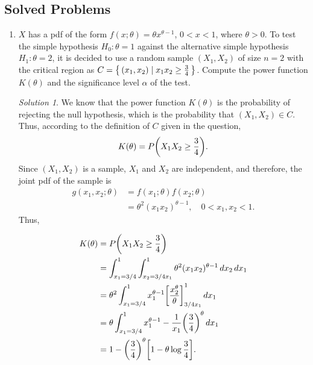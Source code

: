 \documentclass[svgnames, a5paper]{article}
\theoremstyle{definition}
\theoremstyle{remark}
\newtheorem*{Solution*}{Solution}
\begin{document}
\subsection{Solved Problems}\label{subsec:SolvedProblems1}
\begin{enumerate}
\item $X$ has a pdf of the form $f(x; \theta) = \theta x^{\theta - 1}$, $0 < x < 1$, where $\theta > 0$. To test the simple hypothesis $H_0 \colon \theta = 1$ against the alternative simple hypothesis $H_1 \colon \theta = 2$, it is decided to use a random sample $(X_1, X_2)$ of size $n = 2$ with the critical region as $C = \qty{\, (x_1, x_2) \mid x_1 x_2 \ge \frac 3 4 \,}$. Compute the power function $K(\theta)$ and the significance level $\alpha$ of the test.
\begin{Solution*}
We know that the power function $K(\theta)$ is the probability of rejecting the null hypothesis, which is the probability that $(X_1, X_2) \in C$. Thus, according to the definition of $C$ given in the question,
\begin{align*}
K(\theta) = P\pqty{ X_1 X_2 \ge \frac 3 4 }.
\end{align*}
Since $(X_1, X_2)$ is a sample, $X_1$ and $X_2$ are independent, and therefore, the joint pdf of the sample is
\begin{align*}
g(x_1, x_2; \theta) &= f(x_1; \theta) f(x_2; \theta) \\
	&= \theta^2 (x_1 x_2)^{\theta - 1}, \quad 0 < x_1, x_2 < 1.
\end{align*}
Thus,\\
\begin{minipage}[h]{0.5\linewidth}\small
\begin{align*}
K(\theta) & = P\pqty{ X_1 X_2 \ge \frac 3 4 } \\
	&= \int_{x_1 = 3/4}^1 \int_{x_2 = 3/4x_1}^1 \theta^2 (x_1 x_2)^{\theta - 1} \,dx_2 \,dx_1\\
	&= \theta^2 \int_{x_1 = 3/4}^1 x_1^{\theta - 1} \bqty{\dfrac{x_2^\theta}{\theta}}_{3/4x_1}^1 \,dx_1\\
	&= \theta \int_{x_1 = 3/4}^1 x_1^{\theta - 1} - \dfrac 1 {x_1} \pqty{\dfrac 3 4}^\theta \,dx_1\\
	&= 1 - \pqty{\dfrac 3 4}^\theta \bqty{1 - \theta \log \dfrac 3 4 }.
\end{align*}
\end{minipage}\quad
\begin{minipage}{0.4\linewidth}

\end{minipage}
\end{Solution*}
\end{enumerate}
\end{document}
